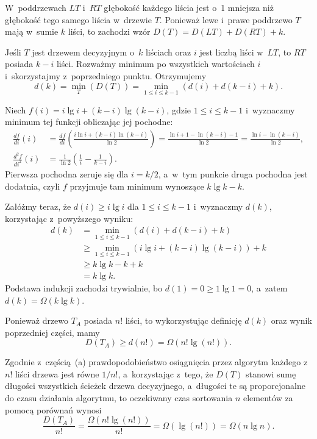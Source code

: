 \subproblem %
W~poddrzewach $LT$ i~$RT$ głębokość każdego liścia jest o~1 mniejsza niż głębokość tego samego liścia w~drzewie $T$. Ponieważ lewe i~prawe poddrzewo $T$ mają w~sumie $k$ liści, to zachodzi wzór $D(T)=D(LT)+D(RT)+k$.

\subproblem %
Jeśli $T$ jest drzewem decyzyjnym o~$k$ liściach oraz $i$ jest liczbą liści w~$LT$, to $RT$ posiada $k-i$ liści. Rozważmy minimum po wszystkich wartościach $i$ i~skorzystajmy z~poprzedniego punktu. Otrzymujemy
\[
	d(k) = \min_T(D(T)) = \min_{1\le i\le k-1}(d(i)+d(k-i)+k).
\]

\subproblem %
Niech $f(i)=i\lg i+(k-i)\lg(k-i)$, gdzie $1\le i\le k-1$ i~wyznaczmy minimum tej funkcji obliczając jej pochodne:
\begin{align*}
	\frac{df}{di}(i) &= \frac{df}{di}\left(\frac{i\ln i+(k-i)\ln(k-i)}{\ln2}\right) = \frac{\ln i+1-\ln(k-i)-1}{\ln2} = \frac{\ln i-\ln(k-i)}{\ln2}, \\[2mm]
	\frac{d^2\!f}{di^2}(i) &= \frac{1}{\ln2}\left(\frac{1}{i}-\frac{1}{k-i}\right).
\end{align*}
Pierwsza pochodna zeruje się dla $i=k/2$, a~w~tym punkcie druga pochodna jest dodatnia, czyli $f$ przyjmuje tam minimum wynoszące $k\lg k-k$.

Załóżmy teraz, że $d(i)\ge i\lg i$ dla $1\le i\le k-1$ i~wyznaczmy $d(k)$, korzystając z~powyższego wyniku:
\begin{align*}
	d(k) &= \min_{1\le i\le k-1}(d(i)+d(k-i)+k) \\
	&\ge \min_{1\le i\le k-1}(i\lg i+(k-i)\lg(k-i))+k \\
	&\ge k\lg k-k+k \\
	&= k\lg k.
\end{align*}
Podstawa indukcji zachodzi trywialnie, bo $d(1)=0\ge 1\lg1=0$, a~zatem $d(k)=\Omega(k\lg k)$.

\subproblem %
Ponieważ drzewo $T_A$ posiada $n!$ liści, to wykorzystując definicję $d(k)$ oraz wynik poprzedniej części, mamy
\[
	D(T_A) \ge d(n!) = \Omega(n!\lg(n!)).
\]

Zgodnie z~częścią~(a) prawdopodobieństwo osiągnięcia przez algorytm każdego z~$n!$ liści drzewa jest równe $1/n!$, a~korzystając z~tego, że $D(T)$ stanowi sumę długości wszystkich ścieżek drzewa decyzyjnego, a~długości te są proporcjonalne do czasu działania algorytmu, to oczekiwany czas sortowania $n$ elementów za pomocą porównań wynosi
\[
	\frac{D(T_A)}{n!} = \frac{\Omega(n!\lg(n!))}{n!} = \Omega(\lg(n!)) = \Omega(n\lg n).
\]

